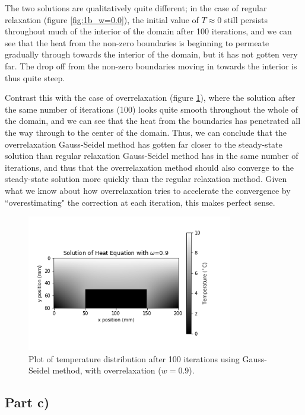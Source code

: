 \documentclass{article}
\begin{document}
The two solutions are qualitatively quite different; in the case of regular relaxation (figure \ref{fig:1b_w=0.0}), the initial value of $T\approx 0$ still persists throughout much of the interior of the domain after 100 iterations, and we can see that the heat from the non-zero boundaries is beginning to permeate gradually through towards the interior of the domain, but it has not gotten very far. The drop off from the non-zero boundaries moving in towards the interior is thus quite steep.

Contrast this with the case of overrelaxation (figure \ref{fig:1b_w=0.9}), where the solution after the same number of iterations (100) looks quite smooth throughout the whole of the domain, and we can see that the heat from the boundaries has penetrated all the way through to the center of the domain. Thus, we can conclude that the overrelaxation Gauss-Seidel method has gotten far closer to the steady-state solution than regular relaxation Gauss-Seidel method has in the same number of iterations, and thus that the overrelaxation method should also converge to the steady-state solution more quickly than the regular relaxation method. Given what we know about how overrelaxation tries to accelerate the convergence by ``overestimating" the correction at each iteration, this makes perfect sense.


\begin{figure}[H]
	\centering
	\includegraphics[width=0.8\textwidth]{../images/q1_b_0p9.png}
	\caption{Plot of temperature distribution after 100 iterations using Gauss-Seidel method, with overrelaxation ($w=0.9$).}
	\label{fig:1b_w=0.9}
\end{figure}

\subsection{Part c)}
\end{document}
